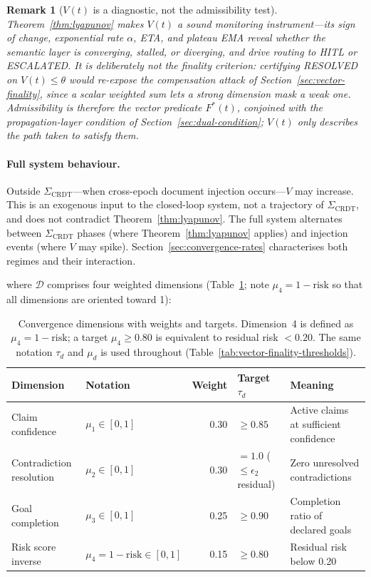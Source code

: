 \documentclass[11pt]{article}
\newtheorem{remark}{Remark}
\begin{document}
\begin{remark}[$V(t)$ is a diagnostic, not the admissibility test]
\label{rem:v-diagnostic}
Theorem~\ref{thm:lyapunov} makes $V(t)$ a sound \emph{monitoring} instrument---its sign of change, exponential rate $\alpha$, ETA, and plateau EMA reveal whether the semantic layer is converging, stalled, or diverging, and drive routing to HITL or ESCALATED. It is deliberately \emph{not} the finality criterion: certifying RESOLVED on $V(t) \le \theta$ would re-expose the compensation attack of Section~\ref{sec:vector-finality}, since a scalar weighted sum lets a strong dimension mask a weak one. Admissibility is therefore the \emph{vector} predicate $F^*(t)$, conjoined with the propagation-layer condition of Section~\ref{sec:dual-condition}; $V(t)$ only describes the path taken to satisfy them.
\end{remark}

\paragraph{Full system behaviour.}
Outside $\Sigma_{\mathrm{CRDT}}$---when cross-epoch document injection occurs---$V$ may increase. This is an exogenous input to the closed-loop system, not a trajectory of $\Sigma_{\mathrm{CRDT}}$, and does not contradict Theorem~\ref{thm:lyapunov}. The full system alternates between $\Sigma_{\mathrm{CRDT}}$ phases (where Theorem~\ref{thm:lyapunov} applies) and injection events (where $V$ may spike). Section~\ref{sec:convergence-rates} characterises both regimes and their interaction.

where $\mathcal{D}$ comprises four weighted dimensions (Table~\ref{tab:dimensions}; note $\mu_4 = 1 - \mathrm{risk}$ so that all dimensions are oriented toward 1):

\begin{table}[H]
\centering
\begin{tabular}{llrll}
\toprule
\textbf{Dimension} & \textbf{Notation} & \textbf{Weight} & \textbf{Target $\tau_d$} & \textbf{Meaning} \\
\midrule
Claim confidence & $\mu_1 \in [0,1]$ & 0.30 & $\geq 0.85$ & Active claims at sufficient confidence \\
Contradiction resolution & $\mu_2 \in [0,1]$ & 0.30 & $= 1.0$ ($\leq \epsilon_2$ residual) & Zero unresolved contradictions \\
Goal completion & $\mu_3 \in [0,1]$ & 0.25 & $\geq 0.90$ & Completion ratio of declared goals \\
Risk score inverse & $\mu_4 = 1 - \mathrm{risk} \in [0,1]$ & 0.15 & $\geq 0.80$ & Residual risk below 0.20 \\
\bottomrule
\end{tabular}
\caption{Convergence dimensions with weights and targets. Dimension~4 is defined as $\mu_4 = 1 - \mathrm{risk}$; a target $\mu_4 \geq 0.80$ is equivalent to residual risk $< 0.20$. The same notation $\tau_d$ and $\mu_d$ is used throughout (Table~\ref{tab:vector-finality-thresholds}).}
\label{tab:dimensions}
\end{table}
\end{document}
